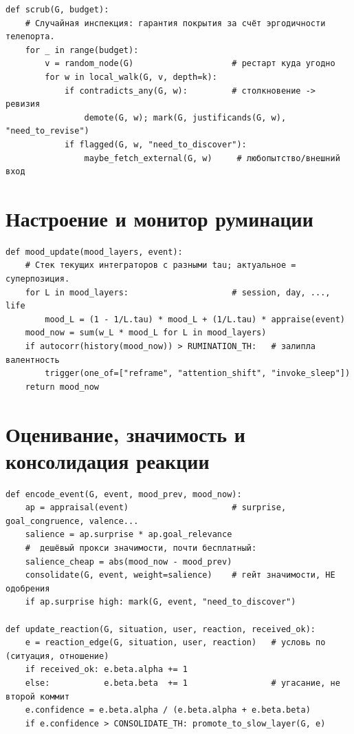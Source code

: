 \begin{lstlisting}[style=pseudo]
def scrub(G, budget):
    # Случайная инспекция: гарантия покрытия за счёт эргодичности телепорта.
    for _ in range(budget):
        v = random_node(G)                    # рестарт куда угодно
        for w in local_walk(G, v, depth=k):
            if contradicts_any(G, w):         # столкновение -> ревизия
                demote(G, w); mark(G, justificands(G, w), "need_to_revise")
            if flagged(G, w, "need_to_discover"):
                maybe_fetch_external(G, w)     # любопытство/внешний вход
\end{lstlisting}

\section{Настроение и монитор руминации}

\begin{lstlisting}[style=pseudo]
def mood_update(mood_layers, event):
    # Стек текущих интеграторов с разными tau; актуальное = суперпозиция.
    for L in mood_layers:                     # session, day, ..., life
        mood_L = (1 - 1/L.tau) * mood_L + (1/L.tau) * appraise(event)
    mood_now = sum(w_L * mood_L for L in mood_layers)
    if autocorr(history(mood_now)) > RUMINATION_TH:   # залипла валентность
        trigger(one_of=["reframe", "attention_shift", "invoke_sleep"])
    return mood_now
\end{lstlisting}

\section{Оценивание, значимость и консолидация реакции}

\begin{lstlisting}[style=pseudo]
def encode_event(G, event, mood_prev, mood_now):
    ap = appraisal(event)                     # surprise, goal_congruence, valence...
    salience = ap.surprise * ap.goal_relevance
    #  дешёвый прокси значимости, почти бесплатный:
    salience_cheap = abs(mood_now - mood_prev)
    consolidate(G, event, weight=salience)    # гейт значимости, НЕ одобрения
    if ap.surprise high: mark(G, event, "need_to_discover")

def update_reaction(G, situation, user, reaction, received_ok):
    e = reaction_edge(G, situation, user, reaction)   # условь по (ситуация, отношение)
    if received_ok: e.beta.alpha += 1
    else:           e.beta.beta  += 1                 # угасание, не второй коммит
    e.confidence = e.beta.alpha / (e.beta.alpha + e.beta.beta)
    if e.confidence > CONSOLIDATE_TH: promote_to_slow_layer(G, e)
\end{lstlisting}


